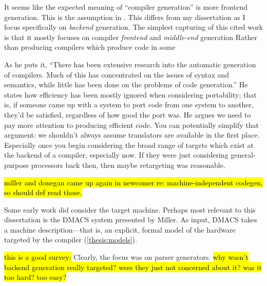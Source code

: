 It seems like the expected meaning
  of ``compiler generation''
  is more frontend generation.
This is the assumption in \cite{
  mosses1975mathematical,
  Jones1980CompilerGF,
  Sethi1981CircularEE,
  Smith2005SemanticsDirectedCG}.
This differs
  from my dissertation
  as I focus specifically on
  \textit{backend} generation.
The simplest capturing
  of this cited work
  is that it mostly focuses on
  compiler \textit{frontend}
  and \textit{middle-end}
  generation
Rather than producing compilers
  which produce code 
  in some 

\cite{Newcomer1975MachineindependentGO}
As he puts it,
``There has been extensive research into the automatic generation of compilers.
Much of this has concentrated on the issues of syntax and semantics, while little has
been done on the problems of code generation.''
He states
  how efficiency has been mostly ignored
  when considering portability;
  that is, if someone came up with a system to port code
  from one system to another,
  they'd be satisfied,
  regardless of how good the port was.
He argues we need to pay more attention to 
  producing efficient code.
You can potentially simplify that argument:
  we shouldn't always assume
  translators are available in the first place.
Especially once you begin considering
  the broad range of targets which exist
  at the backend of a compiler, especially
  now.
If they were just considering 
  general-purpose processors back then,
  then maybe retargeting was reasonable.


\hl{miller and donegan came up again in newcomer re: machine-independent codegen, so should def read those.}


Some early work did consider
  the target machine.
Perhaps most relevant to this dissertation
  is the DMACS system presented by Miller.
As input, DMACS takes
  a machine description---that is,
  an explicit, formal model of the hardware
  targeted by the compiler (\cref{thesis:models}).
\cite{miller1971automatic} 

\hl{this is a good survey:} \cite{Feldman1968TranslatorWS}
Clearly, the focus was on
  parser generators.
\hl{why wasn't backend generation really 
  targeted? 
  were they just not concerned about it? was it too hard?
  too easy?}

% 

% 